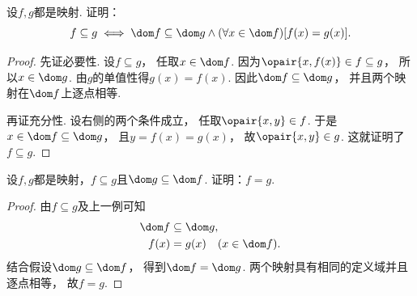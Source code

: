 \begin{example}
    设\(f,g\)都是映射.
    证明：
    \begin{equation*}
        f \subseteq g
        \iff
        \dom f \subseteq \dom g
        \land
        (\forall x \in \dom f)
        [f(x) = g(x)].
    \end{equation*}
    \begin{proof}
        先证必要性.
        设\(f\subseteq g\)，
        任取\(x\in\dom f\).
        因为\(\opair{x,f(x)}\in f\subseteq g\)，
        所以\(x\in\dom g\).
        由\(g\)的单值性得\(g(x)=f(x)\).
        因此\(\dom f\subseteq\dom g\)，
        并且两个映射在\(\dom f\)上逐点相等.

        再证充分性.
        设右侧的两个条件成立，
        任取\(\opair{x,y}\in f\).
        于是\(x\in\dom f\subseteq\dom g\)，
        且\(y=f(x)=g(x)\)，
        故\(\opair{x,y}\in g\).
        这就证明了\(f\subseteq g\).
    \end{proof}
\end{example}

\begin{example}
    设\(f,g\)都是映射，\(f \subseteq g\)且\(\dom g \subseteq \dom f\).
    证明：\(f=g\).
    \begin{proof}
        由\(f\subseteq g\)及上一例可知
        \begin{align*}
            \dom f &\subseteq\dom g, \\
            f(x) &=g(x)\quad(x\in\dom f).
        \end{align*}
        结合假设\(\dom g\subseteq\dom f\)，
        得到\(\dom f=\dom g\).
        两个映射具有相同的定义域并且逐点相等，
        故\(f=g\).
    \end{proof}
\end{example}

